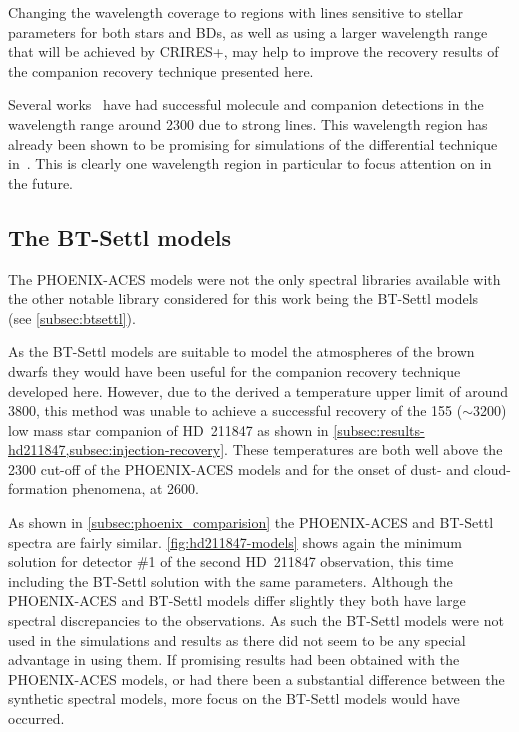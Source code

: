 Changing the wavelength coverage to regions with lines sensitive to stellar parameters for both stars and {BD}s, as well as using a larger wavelength range that will be achieved by {CRIRES+}, may help to improve the recovery results of the companion recovery technique presented here.

Several works~\citep[e.g.][]{brogi_carbon_2014, brogi_rotation_2016, piskorz_evidence_2016} have had successful molecule and companion detections in the wavelength range around 2300\nm{} due to strong  lines.
This wavelength region has already been shown to be promising for simulations of the differential technique in~\citet{kostogryz_spectral_2013}.
This is clearly one wavelength region in particular to focus attention on in the future.

\subsection{The {BT-Settl} models}
\label{subsec:bt-settl}
The {PHOENIX-ACES} models were not the only spectral libraries available with the other notable library considered for this work being the {BT-Settl} models~\citep{allard_model_2010,allard_btsettl_2013,baraffe_new_2015} (see \cref{subsec:btsettl}).

As the {BT-Settl} models are suitable to model the atmospheres of the brown dwarfs they would have been useful for the companion recovery technique developed here.
However, due to the derived a temperature upper limit of around 3800\K{}, this method was unable to achieve a successful recovery of the 155\Mjup{} (\Teff{}\(\sim\)3200\K{}) low mass star companion of {HD~211847} as shown in \cref{subsec:results-hd211847,subsec:injection-recovery}.
These temperatures are both well above the 2300\K{} cut-off of the {PHOENIX-ACES} models and for the onset of dust- and cloud-formation phenomena, at 2600\K{}.

As shown in \cref{subsec:phoenix_comparision} the {PHOENIX-ACES} and {BT-Settl} spectra are fairly similar.
\cref{fig:hd211847-models} shows again the minimum \textchisquared{} solution for detector \#1 of the second {HD~211847} observation, this time including the {BT-Settl} solution with the same parameters.
Although the {PHOENIX-ACES} and {BT-Settl} models differ slightly they both have large spectral discrepancies to the observations.
As such the {BT-Settl} models were not used in the \textchisquared{} simulations and results as there did not seem to be any special advantage in using them.
If promising results had been obtained with the {PHOENIX-ACES} models, or had there been a substantial difference between the synthetic spectral models, more focus on the {BT-Settl} models would have occurred.

